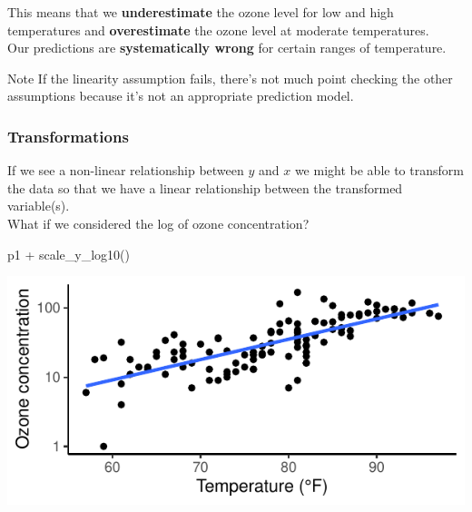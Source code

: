 \documentclass[a4paper]{article}\usepackage[]{graphicx}\usepackage[]{xcolor}
\makeatletter
\def\maxwidth{ %
  \ifdim\Gin@nat@width>\linewidth
    \linewidth
  \else
    \Gin@nat@width
  \fi
}
\makeatother
\begin{document}
\hspace{0.02\textwidth}
\begin{minipage}[m]{0.49\textwidth}
This means that we \textcolor{myred}{\textbf{underestimate}} the ozone level for low and high temperatures and \textcolor{myred}{\textbf{overestimate}} the ozone level at moderate temperatures.\\
Our predictions are \textcolor{myblue}{\textbf{systematically wrong}} for certain ranges of temperature.
\begin{bluebox}{Note}
	If the linearity assumption fails, there's not much point checking the other assumptions because it's not an appropriate prediction model.
\end{bluebox}
\end{minipage}
\subsubsection{Transformations}
If we see a non-linear relationship between \( y \) and \( x \) we might be able to transform the data so that we have a linear relationship between the transformed variable(s).\\
What if we considered the log of ozone concentration?
\begin{Schunk}
\begin{Sinput}
p1 + scale_y_log10()
\end{Sinput}


{\centering \includegraphics[width=\maxwidth]{figure/listings-unnamed-chunk-346-1} 

}

\end{Schunk}
\end{document}
